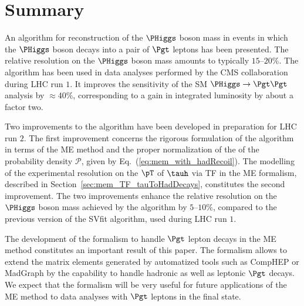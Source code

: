 \section{Summary}
\label{sec:summary}

An algorithm for reconstruction of the $\PHiggs$ boson mass in events
in which the $\PHiggs$ boson decays into a pair of $\Pgt$ leptons has been
presented.
The relative resolution on the $\PHiggs$ boson mass amounts to typically
$15$--$20\%$.
The algorithm has been used in data analyses performed by the CMS
collaboration during LHC run $1$.
It improves the sensitivity of the SM $\PHiggs \to \Pgt\Pgt$ analysis by $\approx 40\%$,
corresponding to a gain in integrated luminosity by about a factor two.

Two improvements to the algorithm have been developed in preparation
for LHC run $2$.
The first improvement concerns the rigorous formulation of the
algorithm in terms of the ME method
and the proper normalization of the of the probability density 
$\mathcal{P}$, given by Eq.~(\ref{eq:mem_with_hadRecoil}).
The modelling of the experimental resolution on the $\pT$ of $\tauh$ via TF in the ME
formalism, described in Section~\ref{sec:mem_TF_tauToHadDecays}, constitutes the second improvement.
The two improvements enhance the relative resolution on the $\PHiggs$ boson mass
achieved by the algorithm by $5$--$10\%$, 
compared to the previous version of the SVfit algorithm, used during LHC run $1$.

The development of the formalism to handle $\Pgt$ lepton decays
in the ME method constitutes an important result of this paper.
The formalism allows to extend the matrix elements generated by automatized tools such as
CompHEP or MadGraph by the capability to handle hadronic as well as leptonic $\Pgt$ decays.
We expect that the formalism will be very useful for future
applications of the ME method to data analyses with $\Pgt$ leptons in
the final state. 
